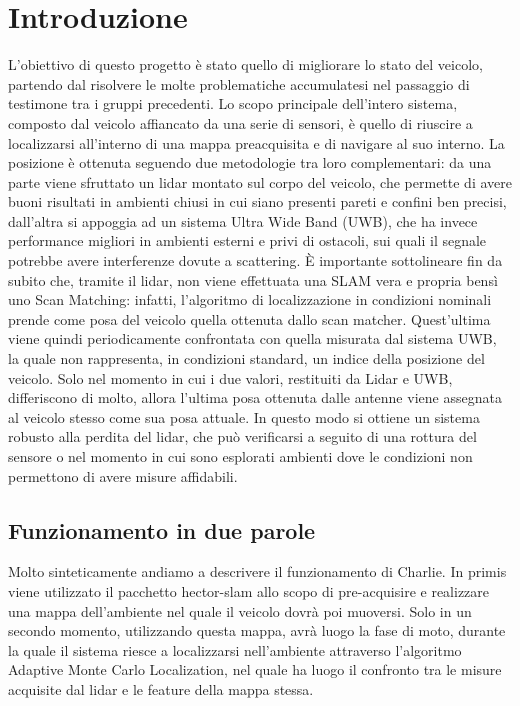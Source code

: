 
\graphicspath{{./figs/}}


	


\newpage\null\thispagestyle{empty}\newpage
\newpage
{}
\setcounter{page}{1}
\tableofcontents
\newpage

%
%


\section*{Introduzione}
L'obiettivo di questo progetto \`e stato quello di migliorare lo stato del veicolo, partendo dal risolvere le molte problematiche accumulatesi nel passaggio di testimone tra i gruppi precedenti.
Lo scopo principale dell'intero sistema, composto dal veicolo affiancato da una serie di sensori, \`e quello di riuscire a localizzarsi all'interno di una mappa preacquisita e di navigare al suo interno.
La posizione \`e ottenuta seguendo due metodologie tra loro complementari: da una parte viene sfruttato un lidar montato sul corpo del veicolo, che permette di avere buoni risultati in ambienti chiusi in cui siano presenti pareti e confini ben precisi, dall'altra si appoggia ad un sistema Ultra Wide Band (UWB), che ha invece performance migliori in ambienti esterni e privi di ostacoli, sui quali il segnale potrebbe avere interferenze dovute a scattering.
\`E importante sottolineare fin da subito che, tramite il lidar, non viene effettuata una SLAM vera e propria bens\`i uno Scan Matching: infatti, l'algoritmo di localizzazione in condizioni nominali prende come posa del veicolo quella ottenuta dallo scan matcher. 
Quest'ultima viene quindi periodicamente confrontata con quella misurata dal sistema UWB, la quale non rappresenta, in condizioni standard, un indice della posizione del veicolo. Solo nel momento in cui i due valori, restituiti da Lidar e UWB, differiscono di molto, allora l'ultima posa ottenuta dalle antenne viene assegnata al veicolo stesso come sua posa attuale.
In questo modo si ottiene un sistema robusto alla perdita del lidar, che pu\`o verificarsi a seguito di una rottura del sensore o nel momento in cui sono esplorati ambienti dove le condizioni non permettono di avere misure affidabili.

\subsection*{Funzionamento in due parole}
Molto sinteticamente andiamo a descrivere il funzionamento di Charlie. 
In primis viene utilizzato il pacchetto hector-slam allo scopo di pre-acquisire e realizzare una mappa dell'ambiente nel quale il veicolo dovrà poi muoversi. 
Solo in un secondo momento, utilizzando questa mappa, avrà luogo la fase di moto, durante la quale il sistema riesce a localizzarsi nell'ambiente attraverso l'algoritmo Adaptive Monte Carlo Localization, nel quale ha luogo il confronto tra le misure acquisite dal lidar e le feature della mappa stessa. 

